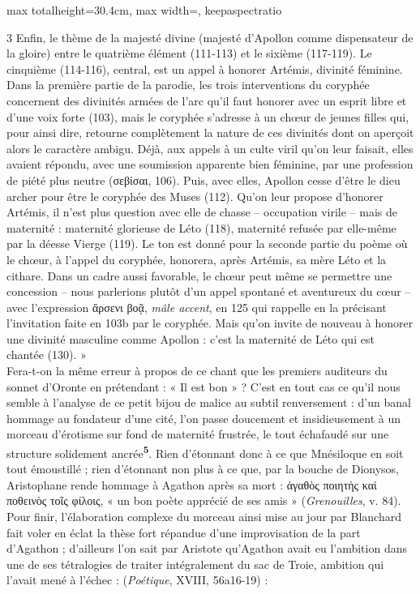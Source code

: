\documentclass[11pt,twoside]{book}
\newcommand{\italique}[1]{\textit{#1}}
\newcommand{\marqueur}[1]{\textsuperscript{\color{rubricRed}\textbf{#1}}}
\begin{document}
\begin{adjustbox}{max totalheight=30.4cm, max width=\textwidth, keepaspectratio}
\begin{minipage}{\textwidth}
{\begin{multicols}{3}
\noindent Enfin, le thème de la majesté divine (majesté d'Apollon comme dispensateur de la gloire) entre le quatrième élément (111-113) et le sixième (117-119). Le cinquième (114-116), central, est un appel à honorer Artémis, divinité féminine. Dans la première partie de la parodie, les trois interventions du coryphée concernent des divinités armées de l'arc qu'il faut honorer avec un esprit libre et d'une voix forte (103), mais le coryphée s'adresse à un chœur de jeunes filles qui, pour ainsi dire, retourne complètement la nature de ces divinités dont on aperçoit alors le caractère ambigu. Déjà, aux appels à un culte viril qu'on leur faisait, elles avaient répondu, avec une soumission apparente bien féminine, par une profession de piété plus neutre (σεβίσαι, 106). Puis, avec elles, Apollon cesse d'être le dieu archer pour être le coryphée des Muses (112). Qu'on leur propose d'honorer Artémis, il n'est plus question avec elle de chasse – occupation virile – mais de maternité : maternité glorieuse de Léto (118), maternité refusée par elle-même par la déesse Vierge (119). Le ton est donné pour la seconde partie du poème où le chœur, à l'appel du coryphée, honorera, après Artémis, sa mère Léto et la cithare. Dans un cadre aussi favorable, le chœur peut même se permettre une concession – nous parlerions plutôt d'un appel spontané et aventureux du cœur – avec l'expression ἄρσενι βοᾷ, \italique{mâle accent}, en 125 qui rappelle en la précisant l'invitation faite en 103b par le coryphée. Mais qu'on invite de nouveau à honorer une divinité masculine comme Apollon : c'est la maternité de Léto qui est chantée (130). »\\ Fera-t-on la même erreur à propos de ce chant que les premiers auditeurs du sonnet d'Oronte en prétendant : « Il est bon » ? C'est en tout cas ce qu'il nous semble à l'analyse de ce petit bijou de malice au subtil renversement : d'un banal hommage au fondateur d'une cité, l'on passe doucement et insidieusement à un morceau d'érotisme sur fond de maternité frustrée, le tout échafaudé sur une structure solidement ancrée\marqueur{5}. Rien d'étonnant donc à ce que Mnésiloque en soit tout émoustillé ; rien d'étonnant non plus à ce que, par la bouche de Dionysos, Aristophane rende hommage à Agathon après sa mort : ἀγαθὸς ποιητὴς καὶ ποθεινὸς τοῖς φίλοις, « un bon poète apprécié de ses amis » (\italique{Grenouilles}, v. 84). Pour finir, l'élaboration complexe du morceau ainsi mise au jour par Blanchard fait voler en éclat la thèse fort répandue d'une improvisation de la part d'Agathon ; d'ailleurs l'on sait par Aristote qu'Agathon avait eu l'ambition dans une de ses tétralogies de traiter intégralement du sac de Troie, ambition qui l'avait mené à l'échec : (\italique{Poétique}, XVIII, 56a16-19) :

\end{multicols}}
\end{minipage}
\end{adjustbox}
\end{document}
